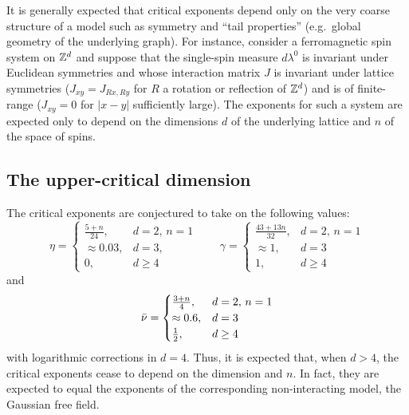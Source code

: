 It is generally expected that critical exponents depend only on the very coarse structure of a model such as symmetry and ``tail properties'' (e.g.\ global geometry of the underlying graph). For instance, consider a ferromagnetic spin system on ${ {{\mathbb Z}}^d }$ and suppose that the single-spin measure
$d\lambda^0$ is invariant under Euclidean symmetries and whose interaction matrix $J$ is invariant under lattice symmetries ($J_{xy} = J_{Rx,Ry}$ for $R$ a rotation or reflection of ${ {{\mathbb Z}}^d }$) and is of finite-range ($J_{xy} = 0$ for $|x - y|$ sufficiently large). The exponents for such a system are expected only to depend on the dimensions $d$ of the underlying lattice and $n$ of the space of spins.



\subsection{The upper-critical dimension}

The critical exponents are conjectured to take on the following values:
\begin{equation}
\eta =
	\begin{cases}
	\frac{5 + n}{24},		& d = 2, \, n = 1 \\
	\approx 0.03,			& d = 3, \\
	0,						& d \ge 4
	\end{cases}
\qquad
\gamma =
	\begin{cases}
	\frac{43 + 13 n}{32},	& d = 2, \, n = 1 \\
	\approx 1,				& d = 3 \\
	1,						& d \ge 4
	\end{cases}
\end{equation}
and
\begin{equation}
\bar\nu =
	\begin{cases}
	\frac{3 + n}{4},		& d = 2, \, n = 1 \\
	\approx 0.6,			& d = 3 \\
	\frac{1}{2},			& d \ge 4
	\end{cases}
\end{equation}
with logarithmic corrections in $d = 4$.
Thus, it is expected that, when $d > 4$, the critical exponents cease to depend
on the dimension and $n$. In fact, they are expected to equal the exponents of
the corresponding non-interacting model, the Gaussian free field.

